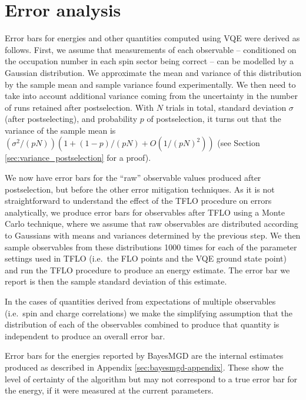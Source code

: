 \documentclass[aps,prb,twoside,superscriptaddress,longbibliography,nofootinbib,floatfix, notitlepage,twocolumn]{revtex4-1}
\begin{document}
{%

\section{Error analysis}
\label{app:error_analysis}

Error bars for energies and other quantities computed using VQE were derived as follows. First, we assume that measurements of each observable -- conditioned on the occupation number in each spin sector being correct -- can be modelled by a Gaussian distribution. We approximate the mean and variance of this distribution by the sample mean and sample variance found experimentally. We then need to take into account additional variance coming from the uncertainty in the number of runs retained after postselection. With $N$ trials in total, standard deviation $\sigma$ (after postselecting), and probability $p$ of postselection, it turns out\cite{marciniak99} that the variance of the sample mean is $(\sigma^2 / (pN))(1 + (1 - p)/(pN) + O(1/(pN)^2))$ (see Section \ref{sec:variance_postselection} for a proof).

We now have error bars for the ``raw'' observable values produced after postselection, but before the other error mitigation techniques. As it is not straightforward to understand the effect of the TFLO procedure on errors analytically, we produce error bars for observables after TFLO using a Monte Carlo technique, where we assume that raw observables are distributed according to Gaussians with means and variances determined by the previous step. We then sample observables from these distributions 1000 times for each of the parameter settings used in TFLO (i.e.\ the FLO points and the VQE ground state point) and run the TFLO procedure to produce an energy estimate. The error bar we report is then the sample standard deviation of this estimate.

In the cases of quantities derived from expectations of multiple observables (i.e.\ spin and charge correlations) we make the simplifying assumption that the distribution of each of the observables combined to produce that quantity is independent to produce an overall error bar.

Error bars for the energies reported by BayesMGD are the internal estimates produced as described in Appendix \ref{sec:bayesmgd-appendix}. These show the level of certainty of the algorithm but may not correspond to a true error bar for the energy, if it were measured at the current parameters.

}
\end{document}
